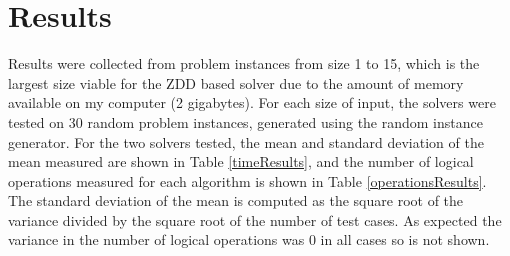 \documentclass[12pt,a4paper,twoside,openright]{report}
\begin{document}
\section{Results}
Results were collected from problem instances from size 1 to 15, which is the largest size viable for the ZDD based solver due to the amount of memory available on my computer (2 gigabytes). For each size of input, the solvers were tested on 30 random problem instances, generated using the random instance generator. For the two solvers tested, the mean and standard deviation of the mean measured are shown in Table \ref{timeResults}, and the number of logical operations measured for each algorithm is shown in Table \ref{operationsResults}. The standard deviation of the mean is computed as the square root of the variance divided by the square root of the number of test cases. As expected the variance in the number of logical operations was $0$ in all cases so is not shown.
\end{document}
